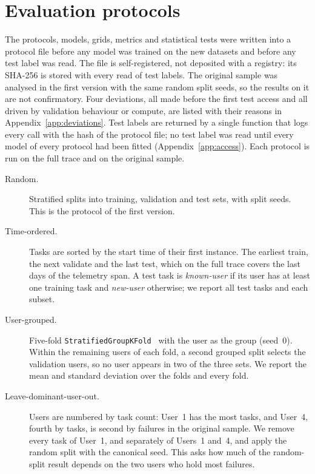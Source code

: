 \section{Evaluation protocols}
\label{sec:protocols}

The protocols, models, grids, metrics and statistical tests were written into a protocol file before any model was trained on the new datasets and before any test label was read. The file is self-registered, not deposited with a registry: its SHA-256 is stored with every read of test labels. The original sample was analysed in the first version with the same random split seeds, so the results on it are not confirmatory. Four deviations, all made before the first test access and all driven by validation behaviour or compute, are listed with their reasons in Appendix~\ref{app:deviations}. Test labels are returned by a single function that logs every call with the hash of the protocol file; no test label was read until every model of every protocol had been fitted (Appendix~\ref{app:access}). Each protocol is run on the full trace and on the original sample.

\begin{description}
\item[Random.] Stratified  splits into training, validation and test sets, with  split seeds. This is the protocol of the first version.
\item[Time-ordered.] Tasks are sorted by the start time of their first instance. The earliest  train, the next  validate and the last  test, which on the full trace covers the last  days of the telemetry span. A test task is \emph{known-user} if its user has at least one training task and \emph{new-user} otherwise; we report all test tasks and each subset.
\item[User-grouped.] Five-fold \texttt{StratifiedGroupKFold}~\cite{pedregosa2011sklearn} with the user as the group (seed~0). Within the remaining users of each fold, a second grouped split selects the validation users, so no user appears in two of the three sets. We report the mean and standard deviation over the  folds and every fold.
\item[Leave-dominant-user-out.] Users are numbered by task count: User~1 has the most tasks, and User~4, fourth by tasks, is second by failures in the original sample. We remove every task of User~1, and separately of Users~1 and~4, and apply the random split with the canonical seed. This asks how much of the random-split result depends on the two users who hold most failures.
\end{description}

